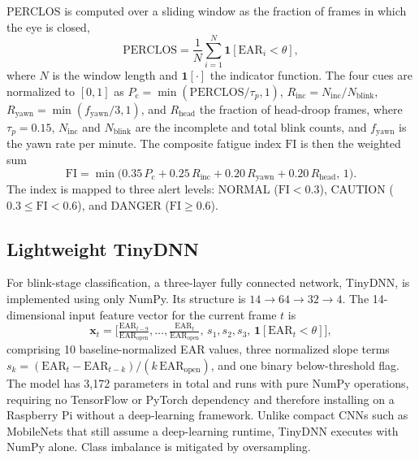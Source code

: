 \documentclass{IEEE_lsens}
\begin{document}
PERCLOS is computed over a sliding window as the fraction of frames in which
the eye is closed,
\begin{equation}
\mathrm{PERCLOS}=\frac{1}{N}\sum_{i=1}^{N}\mathbf{1}\!\left[\mathrm{EAR}_i<\theta\right],
\label{eq_perclos}
\end{equation}
where $N$ is the window length and $\mathbf{1}[\cdot]$ the indicator function.
The four cues are normalized to $[0,1]$ as
$P_{\text{c}}=\min(\mathrm{PERCLOS}/\tau_p,1)$,
$R_{\text{inc}}=N_{\text{inc}}/N_{\text{blink}}$,
$R_{\text{yawn}}=\min(f_{\text{yawn}}/3,1)$, and
$R_{\text{head}}$ the fraction of head-droop frames, where $\tau_p=0.15$,
$N_{\text{inc}}$ and $N_{\text{blink}}$ are the incomplete and total blink
counts, and $f_{\text{yawn}}$ is the yawn rate per minute. The composite
fatigue index $\mathrm{FI}$ is then the weighted sum
\begin{equation}
\mathrm{FI}=\min\!\big(0.35\,P_{\text{c}}+0.25\,R_{\text{inc}}
+0.20\,R_{\text{yawn}}+0.20\,R_{\text{head}},\,1\big).
\label{eq_fi}
\end{equation}
The index is mapped to three alert levels: NORMAL ($\mathrm{FI}<0.3$),
CAUTION ($0.3\le \mathrm{FI}<0.6$), and DANGER ($\mathrm{FI}\ge 0.6$).

\subsection{Lightweight TinyDNN}
For blink-stage classification, a three-layer fully connected network,
TinyDNN, is implemented using only NumPy. Its structure is
$14\rightarrow 64\rightarrow 32\rightarrow 4$. The 14-dimensional input
feature vector for the current frame $t$ is
\begin{equation}
\bm{x}_t=\Big[\tfrac{\mathrm{EAR}_{t-9}}{\mathrm{EAR}_{\text{open}}},\dots,
\tfrac{\mathrm{EAR}_{t}}{\mathrm{EAR}_{\text{open}}},\,
s_1,s_2,s_3,\,\mathbf{1}[\mathrm{EAR}_t<\theta]\Big],
\label{eq_feat}
\end{equation}
comprising 10 baseline-normalized EAR values, three normalized slope terms
$s_k=(\mathrm{EAR}_t-\mathrm{EAR}_{t-k})/(k\,\mathrm{EAR}_{\text{open}})$, and
one binary below-threshold flag. The model has 3{,}172 parameters in total and
runs with pure NumPy operations, requiring no TensorFlow or PyTorch dependency
and therefore installing on a Raspberry Pi without a deep-learning framework.
Unlike compact CNNs such as MobileNets \cite{howard2017} that still assume a
deep-learning runtime, TinyDNN executes with NumPy alone. Class imbalance is
mitigated by oversampling.
\end{document}
